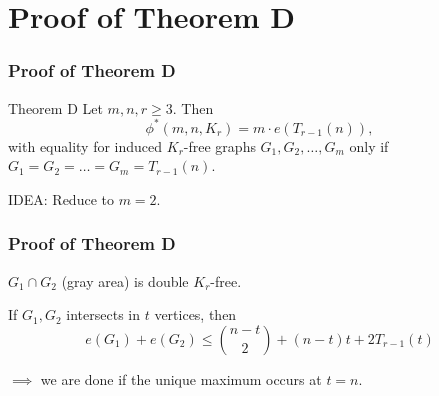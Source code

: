 \documentclass{beamer}
\begin{document}
\section{Proof of Theorem D}

\begin{frame}
  \frametitle{Proof of Theorem D}

  \begin{block}{Theorem D}
    Let $m, n, r \geq 3$. Then 
    \[
      \phi^*(m, n, K_{r}) = m \cdot e(T_{r - 1}(n)),
    \]
    with equality for induced $K_{r}$-free graphs $G_1, G_2, \dots, G_m$ only if $G_1 = G_2 = \dots = G_m = T_{r - 1}(n)$. 
  \end{block}

  \pause

  \vspace{0.7cm}

  IDEA: Reduce to $m = 2$.
\end{frame}

\begin{frame}
  \frametitle{Proof of Theorem D}

  \begin{center}
  \end{center}

  \pause

  $G_1 \cap G_2$ (gray area) is double $K_r$-free.

  \pause

  \vspace{0.5cm}

  If $G_1, G_2$ intersects in $t$ vertices, then
  \[
    e(G_1) + e(G_2) \leq \binom{n - t}{2} + (n - t)t + 2T_{r - 1}(t)
  \]

  \pause

  $\implies$ we are done if the unique maximum occurs at $t = n$.
\end{frame}
\end{document}
